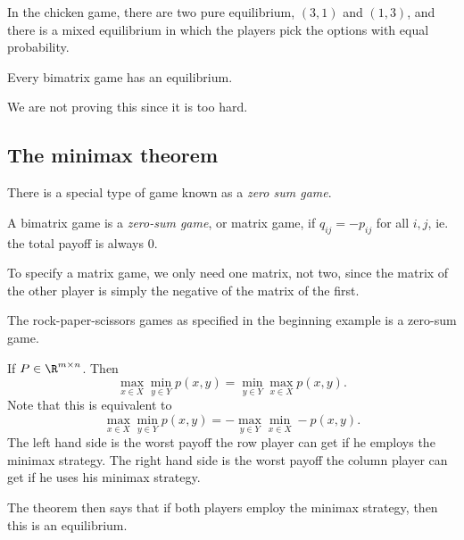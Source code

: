 \documentclass[a4paper]{article}
\begin{document}
\begin{eg}
  In the chicken game, there are two pure equilibrium, $(3, 1)$ and $(1, 3)$, and there is a mixed equilibrium in which the players pick the options with equal probability.
\end{eg}

\begin{thm}[Nash, 1961]
  Every bimatrix game has an equilibrium.
\end{thm}
We are not proving this since it is too hard.

\subsection{The minimax theorem}
There is a special type of game known as a \emph{zero sum game}.
\begin{defi}
  A bimatrix game is a \emph{zero-sum game}, or matrix game, if $q_{ij} = -p_{ij}$ for all $i, j$, ie. the total payoff is always 0.
\end{defi}
To specify a matrix game, we only need one matrix, not two, since the matrix of the other player is simply the negative of the matrix of the first.

\begin{eg}
  The rock-paper-scissors games as specified in the beginning example is a zero-sum game.
\end{eg}

\begin{thm}
  If $P\in \R^{m\times n}$. Then
  \[
    \max_{x\in X}\min_{y\in Y} p(x, y) = \min_{y\in Y}\max_{x\in X} p(x, y).
  \]
  Note that this is equivalent to
  \[
    \max_{x\in X}\min_{y\in Y} p(x, y) = -\max_{y\in Y}\min_{x\in X} -p(x, y).
  \]
  The left hand side is the worst payoff the row player can get if he employs the minimax strategy. The right hand side is the worst payoff the column player can get if he uses his minimax strategy.

  The theorem then says that if both players employ the minimax strategy, then this is an equilibrium.
\end{thm}
\end{document}
